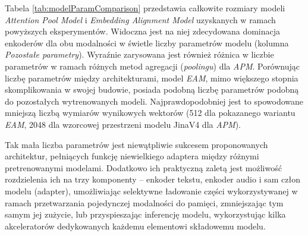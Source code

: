 \begin{table}[!h]
\centering
\caption{Liczba parametrów oraz rozmiar modeli w reprezentacji 32 bitowej liczby zmiennoprzecinkowej. }
\label{tab:modelParamComparison}
\small
\setlength{\tabcolsep}{4pt}
\end{table}

Tabela \ref{tab:modelParamComparison} przedstawia całkowite rozmiary modeli \textit{Attention Pool Model} i \textit{Embedding Alignment Model} uzyskanych w ramach powyższych eksperymentów. Widoczna jest na niej zdecydowana dominacja enkoderów dla obu modalności w świetle liczby parametrów modelu (kolumna \textit{Pozostałe parametry}). Wyraźnie zarysowana jest również różnica w liczbie parametrów w ramach różnych metod agregacji (\textit{poolingu}) dla \textit{APM}. Porównując liczbę parametrów między architekturami, model \textit{EAM}, mimo większego stopnia skomplikowania w swojej budowie, posiada podobną liczbę parametrów podobną do pozostałych wytrenowanych modeli. Najprawdopodobniej jest to spowodowane mniejszą liczbą wymiarów wynikowych wektorów (512 dla pokazanego wariantu \textit{EAM}, 2048 dla wzorcowej przestrzeni modelu JinaV4 dla \textit{APM}).

Tak mała liczba parametrów jest niewątpliwie sukcesem proponowanych architektur, pełniących funkcję niewielkiego adaptera między różnymi pretrenowanymi modelami. Dodatkowo ich praktyczną zaletą jest możliwość rozdzielenia ich na trzy komponenty -- enkoder tekstu, enkoder audio i sam człon modelu (adapter), umożliwiając selektywne ładowanie części wykorzystywanej w ramach przetwarzania pojedynczej modalności do pamięci, zmniejszając tym samym jej zużycie, lub przyspieszając inferencję modelu, wykorzystując kilka akceleratorów dedykowanych każdemu elementowi składowemu modelu.

